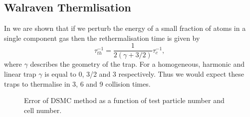 \subsection{Walraven Thermlisation}
In \cite{Walraven2010} we are shown that if we perturb the energy of a small fraction of atoms in a single component gas then the rethermalisation time is given by
\begin{equation}
    \tau_{th}^{-1} = \frac{1}{2\left(\gamma + 3/2\right)} \tau_{c}^{-1},
\end{equation}
where $\gamma$ describes the geometry of the trap. For a homogeneous, harmonic and linear trap $\gamma$ is equal to 0, 3/2 and 3 respectively. Thus we would expect these traps to thermalise in 3, 6 and 9 collision times.

\begin{figure}[bth]
\myfloatalign
{} \quad
{}
\caption[]{Error of DSMC method as a function of test particle number and cell number.}\label{fig:dsmccolerr}
\end{figure}

